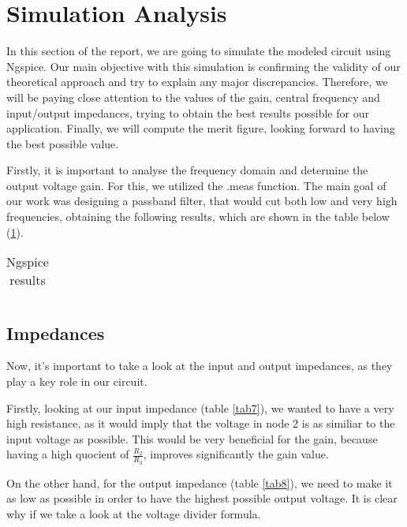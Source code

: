 \section{Simulation Analysis}

In this section of the report, we are going to simulate the modeled circuit using Ngspice. Our main objective with this simulation is confirming the validity of our theoretical approach and try to explain any major discrepancies. Therefore, we will be paying close attention to the values of the gain, central frequency and input/output impedances, trying to obtain the best results possible for our application. Finally, we will compute the merit figure, looking forward to having the best possible value.

Firstly, it is important to analyse the frequency domain and determine the output voltage gain. For this, we utilized the .meas function.
The main goal of our work was designing a passband filter, that would cut both low and very high frequencies, obtaining the following results, which are shown in the table below (\ref{tab6}).

\begin{table}[H]
\centering
\begin{tabularx}{0.6\textwidth} {
  | >{\raggedright\arraybackslash}X
  | >{\raggedleft\arraybackslash}X | }
 \hline

\end{tabularx}
\caption{Ngspice results}
\label{tab6}
\end{table}

\subsection{Impedances}

Now, it's important to take a look at the input and output impedances, as they play a key role in our circuit.

Firstly, looking at our input impedance (table \ref{tab7}), we wanted to have a very high resistance, as it would imply that the voltage in node 2 is as similiar to the input voltage as possible. This would be very beneficial for the gain, because having a high quocient of $\frac{R_2}{R_3}$, improves significantly the gain value.

On the other hand, for the output impedance (table \ref{tab8}), we need to make it as low as possible in order to have the highest possible output voltage. It is clear why if we take a look at the voltage divider formula.

